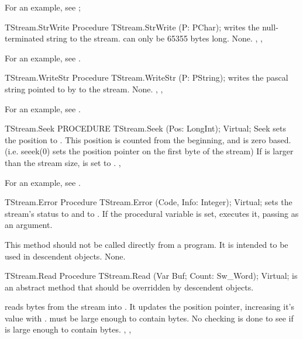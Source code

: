 For an example, see ;

\begin{procedure}{TStream.StrWrite}
\Declaration
Procedure TStream.StrWrite (P: PChar);
\Description
{} writes the null-terminated string  to the stream.
 can only be 65355 bytes long.
\Errors
None.
\SeeAlso
{}, ,
\end{procedure}

For an example, see .

\begin{procedure}{TStream.WriteStr}
\Declaration
Procedure TStream.WriteStr (P: PString);
\Description
{} writes the pascal string pointed to by  to the stream.
\Errors
None.
\SeeAlso
{}, ,
\end{procedure}

For an example, see .

\begin{procedure}{TStream.Seek}
\Declaration      
PROCEDURE TStream.Seek (Pos: LongInt); Virtual;
\Description
Seek sets the position to . This position is counted
from the beginning, and is zero based. (i.e. seeek(0) sets the position
pointer on the first byte of the stream)
\Errors
If  is larger than the stream size,  is set to
.
\SeeAlso
{}, 
\end{procedure}


For an example, see .

\begin{procedure}{TStream.Error}
\Declaration
Procedure TStream.Error (Code, Info: Integer); Virtual;
\Description
{} sets the stream's status to  and 
to . If the  procedural variable is set,
 executes it, passing  as an argument.

This method should not be called directly from a program. It is intended to
be used in descendent objects.
\Errors
None.
\SeeAlso
\end{procedure}

\begin{procedure}{TStream.Read}
\Declaration
Procedure TStream.Read (Var Buf; Count: Sw\_Word); Virtual;
\Description
{} is an abstract method that should be overridden by descendent
objects.

 reads  bytes from the stream into .
It updates the position pointer, increasing it's value with . 
 must be large enough to contain  bytes.
\Errors
No checking is done to see if  is large enough to contain
 bytes. 
\SeeAlso
{}, ,
\end{procedure}

